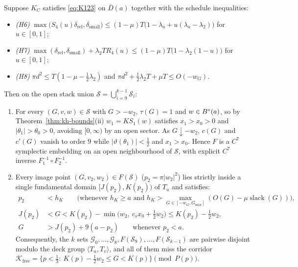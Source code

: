 \begin{theorem}\label{thm:comparator}
Suppose $K_C$ satisfies \eqref{eq:K123} on $\bar D(a)$ together with the schedule inequalities:
\begin{itemize}
\item \emph{(H6)} $\max\bigl(S_4(u)\delta_{\mathrm{rel}},\delta_{\mathrm{small}}\bigr)\le(1-\mu)T\bigl(1-\lambda_a+u(\lambda_a-\lambda_2)\bigr)$ for $u\in[0,1]$;
\item \emph{(H7)} $\max(\delta_{\mathrm{rel}},\delta_{\mathrm{small}})+\lambda_2 T R_4(u)\le(1-\mu)T\bigl(1-\lambda_2(1-u)\bigr)$ for $u\in[0,1]$;
\item \emph{(H8)} $\pi d^2\le T(1-\mu-\frac12\lambda_2)$ and $\pi d^2+\frac12\lambda_2 T+\mu T\le O(-w_G)$.
\end{itemize}
Then on the open stack union $\mathcal S=\bigcup_{i=9}^{k-1}\mathcal S_i$:
\begin{enumerate}[label=(\roman*)]
\item For every $(G,v,w)\in\mathcal S$ with $G>-w_2$, $\tau(G)=1$ and $w\in B^{\circ}(a)$, so by Theorem~\ref{thm:kh-bounds}(ii)
$w_1=KS_1(w)$ satisfies $x_1>x_0>0$ and $|\theta_1|>\theta_0>0$, avoiding $[0,\infty)$ by an open sector. As $G\downarrow-w_2$,
$c(G)$ and $c'(G)$ vanish to order $9$ while $|\vartheta(\theta_1)|<\frac12$ and $x_1>x_0$. Hence $F$ is a $C^7$
symplectic embedding on an open neighbourhood of $\mathcal S$, with explicit $C^7$ inverse $F_1^{-1}\circ F_2^{-1}$.
\item Every image point $(G,v_2,w_2)\in F(\mathcal S)$ ($p_2=\pi|w_2|^2$) lies strictly inside a single fundamental
domain $[J(p_2),K(p_2))$ of $T_u$ and satisfies:
\begin{align}
 p_2 &< h_K \qquad\text{(whenever $h_K\ge a$ and $h_K>\max_{G\in[-w_G,G_{\max}]}(O(G)-\mu\operatorname{slack}(G))$)},
 \label{eq:p2-hK}\\
 J(p_2) &< G < K(p_2) - \min\bigl(w_2,\ c_s x_0+\tfrac12 w_2\bigr) \le K(p_2)-\tfrac12 w_2,
 \label{eq:stack-upper}\\
 G &> J(p_2)+9(a-p_2)\qquad\text{whenever }p_2<a.\label{eq:stack-above-group}
\end{align}
Consequently, the $k$ sets $\mathcal G_0,\dots,\mathcal G_8,F(\mathcal S_9),\dots,F(\mathcal S_{k-1})$ are pairwise
disjoint modulo the deck group $\langle T_u,T_v\rangle$, and all of them miss the corridor
$\mathcal K_{\mathrm{free}}=\{p<\frac13:\ K(p)-\frac12w_2\le G<K(p)\}\pmod{P(p)}$.
\end{enumerate}
\end{theorem}

